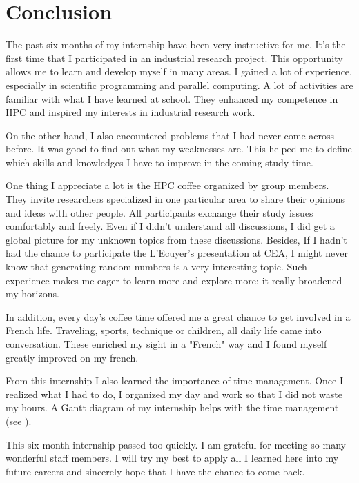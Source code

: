 
\chapter{Conclusion} %

\label{Chapter6} %



The past six months of my internship have been very instructive for me. It's the first time that I participated in an industrial research project. This opportunity allows me to learn and develop myself in many areas. I gained a lot of experience, especially in scientific programming and parallel computing. A lot of activities are familiar with what I have learned at school. They enhanced my competence in HPC and inspired my interests in industrial research work.

On the other hand, I also encountered problems that I had never come across before. It was good to find out what my weaknesses are. This helped me to define which skills and knowledges I have to improve in the coming study time. 

One thing I appreciate a lot is the HPC coffee organized by group members. They invite researchers specialized in one particular area to share their opinions and ideas with other people. All participants exchange their study issues comfortably and freely. Even if I didn't understand all discussions, I did get a global picture for my unknown topics from these discussions. Besides, If I hadn't had the chance to participate the L'Ecuyer's presentation at CEA, I might never know that generating random numbers is a very interesting topic. Such experience makes me eager to learn more and explore more; it really broadened my horizons.

In addition, every day's coffee time offered me a great chance to get involved in a French life. Traveling, sports, technique or children, all daily life came into conversation. These enriched my sight in a "French" way and I found myself greatly improved on my french.

From this internship I also learned the importance of time management. Once I realized what I had to do, I organized my day and work so that I did not waste my hours. A Gantt diagram of my internship helps with the time management (see ).

This six-month internship passed too quickly. I am grateful for meeting so many wonderful staff members. I will try my best to apply all I learned here into my future careers and sincerely hope that I have the chance to come back.